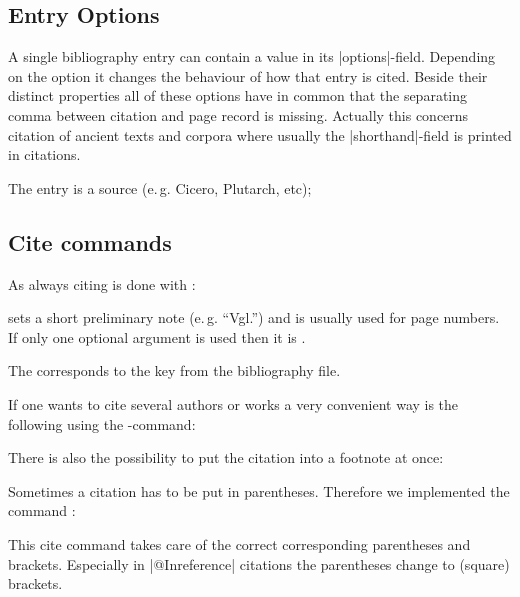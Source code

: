 \documentclass[a4paper,
10pt,
ngerman,
english
]{ltxdoc}
\begin{document}
\subsection{Entry Options}
A single bibliography entry can contain a value in its |options|-field.
Depending on the option it changes the behaviour of how that entry is cited.
Beside their distinct properties all of these options have in common that the separating comma between citation and page record is missing. 
Actually this concerns citation of ancient texts and corpora where usually the |shorthand|-field is printed in citations.

The entry is a source (e.\,g. Cicero, Plutarch, etc); %



\subsection{Cite commands}\label{cite-commands}
\DescribeMacro{\cite}%
As always citing is done with :

 sets a short preliminary note (e.\,g. \enquote{Vgl.}) and  is usually used for page numbers.
If only one optional argument is used then it is .
The  corresponds to the key from the bibliography file.

\DescribeMacro{\cites}
If one wants to cite several authors or works a very convenient way is the following using the -command:
 
 \DescribeMacro{\footcite}
 There is also the possibility to put the citation into a footnote at once:

\DescribeMacro{\parencite}
Sometimes a citation has to be put in parentheses. 
Therefore we implemented the command :
This cite command takes care of the correct corresponding parentheses and brackets.
Especially in |@Inreference| citations the parentheses  change to (square) brackets.
\end{document}
